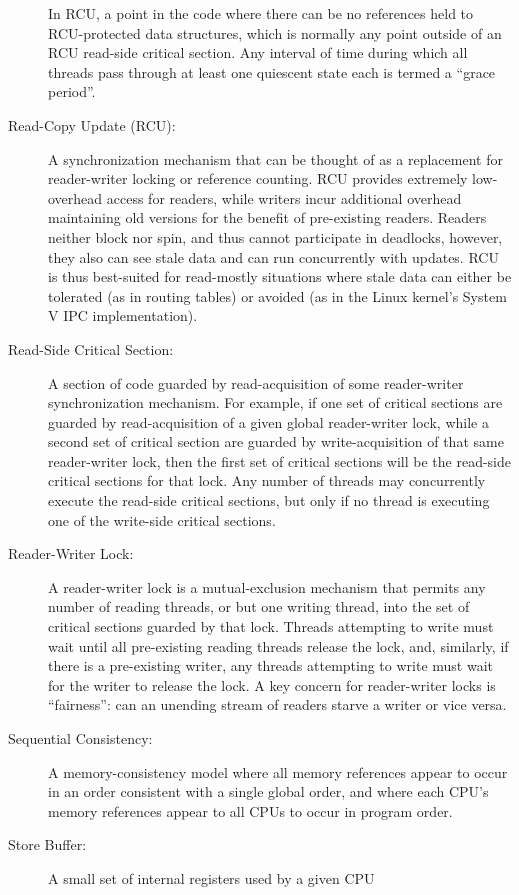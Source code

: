 \begin{description}
	In RCU, a point in the code where there can be no references held
	to RCU-protected data structures, which is normally any point
	outside of an RCU read-side critical section.
	Any interval of time during which all threads pass through at
	least one quiescent state each is termed a ``grace period''.
	\fi
\item[Read-Copy Update (RCU):]
	A synchronization mechanism that can be thought of as a replacement
	for reader-writer locking or reference counting.
	RCU provides extremely low-overhead access for readers, while
	writers incur additional overhead maintaining old versions
	for the benefit of pre-existing readers.
	Readers neither block nor spin, and thus cannot participate in
	deadlocks, however, they also can see stale data and can
	run concurrently with updates.
	RCU is thus best-suited for read-mostly situations where
	stale data can either be tolerated (as in routing tables)
	or avoided (as in the Linux kernel's System V IPC implementation).
\item[Read-Side Critical Section:]
	A section of code guarded by read-acquisition of
	some reader-writer synchronization mechanism.
	For example, if one set of critical sections are guarded by
	read-acquisition of
	a given global reader-writer lock, while a second set of critical
	section are guarded by write-acquisition of that same reader-writer
	lock, then the first set of critical sections will be the
	read-side critical sections for that lock.
	Any number of threads may concurrently execute the read-side
	critical sections, but only if no thread is executing one of
	the write-side critical sections.
\item[Reader-Writer Lock:]
	A reader-writer lock is a mutual-exclusion mechanism that
	permits any number of reading
	threads, or but one writing thread, into the set of critical
	sections guarded by that lock.
	Threads attempting to write must wait until all pre-existing
	reading threads release the lock, and, similarly, if there
	is a pre-existing writer, any threads attempting to write must
	wait for the writer to release the lock.
	A key concern for reader-writer locks is ``fairness'':
	can an unending stream of readers starve a writer or vice versa.
\item[Sequential Consistency:]
	A memory-consistency model where all memory references appear to occur
	in an order consistent with
	a single global order, and where each CPU's memory references
	appear to all CPUs to occur in program order.
\item[Store Buffer:]
	A small set of internal registers used by a given CPU

\end{description}
